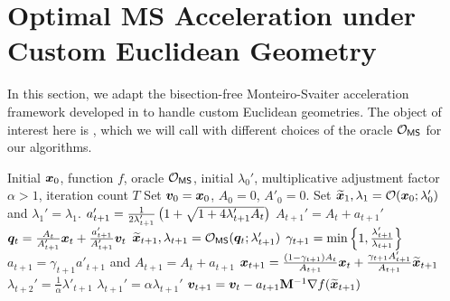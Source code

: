 \section{Optimal MS Acceleration under Custom Euclidean Geometry}
\label{sec:optimal_ms_acceleration}

In this section, we adapt the bisection-free Monteiro-Svaiter acceleration framework developed in \cite{chjjs22} to handle custom Euclidean geometries. The object of interest here is , which we will call with different choices of the oracle $\oms$ for our algorithms.

\begin{algorithm}[H]
\caption{\textsf{OptimalMSAcceleration}: optimizes function $f$ given MS oracle $\oms$.}
\label{alg:optimal_ms_acceleration}
\begin{algorithmic}[1]
\Require Initial $\bm{x}_0$, function $f$, oracle $\oms$, initial $\lambda_0'$, multiplicative adjustment factor $\alpha >1$, iteration count $T$
\State Set $\bm{v}_0 = \bm{x}_0$, $A_0 = 0$, $A'_0 = 0$.
\State Set $\widetilde{\bm{x}}_1, \lambda_1 = \mathcal{O}(\bm{x}_0; \lambda_0')$ and $\lambda_1' = \lambda_1$.
    \State $a_{t+1}' = \frac{1}{2\lambda_{t+1}'}\left(1+\sqrt{1+4\lambda'_{t+1}A_t}\right)$
    \State $A_{t+1}' = A_t+a_{t+1}'$
    \State $\bm{q}_t = \frac{A_t}{A_{t+1}'}\bm{x}_t + \frac{a_{t+1}'}{A_{t+1}'}\bm{v}_t$\label{line:optimal_ms_query}
     $\widetilde{\bm{x}}_{t+1},\lambda_{t+1}=\mathcal{O}_{\mathsf{MS}}(\bm{q}_t;\lambda_{t+1}')$ \label{line:optimal_ms_acceleration_query}\EndIf
    \State $\gamma_{t+1} = \min\left\{1, \frac{\lambda_{t+1}'}{\lambda_{t+1}}\right\}$
    \State $a_{t+1} = \gamma_{t+1}a'_{t+1}$ and $A_{t+1} = A_{t} + a_{t+1}$ 
    \State $\bm{x}_{t+1} = \frac{(1-\gamma_{t+1})A_{t}}{A_{t+1}}\bm{x}_t + \frac{\gamma_{t+1}A_{t+1}'}{A_{t+1}}\widetilde{\bm{x}}_{t+1}$
        \State $\lambda_{t+2}' = \frac{1}{\alpha}\lambda'_{t+1}$
    \Else
        \State $\lambda_{t+1}' = \alpha\lambda_{t+1}'$
    \EndIf
    \State $\bm{v}_{t+1} = \bm{v}_{t}-a_{t+1}\mathbf{M}^{-1}\nabla f(\widetilde{\bm{x}}_{t+1})$
\EndFor
\end{algorithmic}
\end{algorithm}

